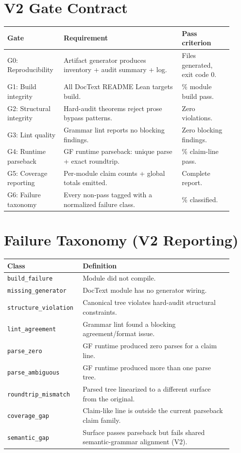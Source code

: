 \documentclass[11pt]{article}
\newcommand{\code}[1]{\texttt{#1}}
\begin{document}
\section{V2 Gate Contract}

\begin{longtable}{>{\raggedright\arraybackslash}p{0.22\linewidth}
                  >{\raggedright\arraybackslash}p{0.49\linewidth}
                  >{\raggedright\arraybackslash}p{0.21\linewidth}}
\toprule
Gate & Requirement & Pass criterion \\
\midrule
G0: Reproducibility & Artifact generator produces inventory + audit summary + log. & Files generated, exit code 0. \\
G1: Build integrity & All DocText README Lean targets build. & 100\% module build pass. \\
G2: Structural integrity & Hard-audit theorems reject prose bypass patterns. & Zero violations. \\
G3: Lint quality & Grammar lint reports no blocking findings. & Zero blocking findings. \\
G4: Runtime parseback & GF runtime parseback: unique parse + exact roundtrip. & 100\% claim-line pass. \\
G5: Coverage reporting & Per-module claim counts + global totals emitted. & Complete report. \\
G6: Failure taxonomy & Every non-pass tagged with a normalized failure class. & 100\% classified. \\
\bottomrule
\end{longtable}

\section{Failure Taxonomy (V2 Reporting)}

\begin{longtable}{>{\raggedright\arraybackslash}p{0.28\linewidth}
                  >{\raggedright\arraybackslash}p{0.64\linewidth}}
\toprule
Class & Definition \\
\midrule
\code{build\_failure} & Module did not compile. \\
\code{missing\_generator} & DocText module has no generator wiring. \\
\code{structure\_violation} & Canonical tree violates hard-audit structural constraints. \\
\code{lint\_agreement} & Grammar lint found a blocking agreement/format issue. \\
\code{parse\_zero} & GF runtime produced zero parses for a claim line. \\
\code{parse\_ambiguous} & GF runtime produced more than one parse tree. \\
\code{roundtrip\_mismatch} & Parsed tree linearized to a different surface from the original. \\
\code{coverage\_gap} & Claim-like line is outside the current parseback claim family. \\
\code{semantic\_gap} & Surface passes parseback but fails shared semantic-grammar alignment (V2). \\
\bottomrule
\end{longtable}
\end{document}
